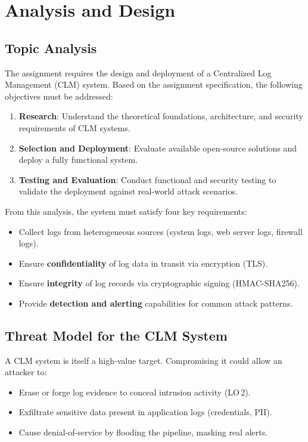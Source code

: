\documentclass[12pt,a4paper]{report}
\begin{document}
\chapter{Analysis and Design}
\label{chap:design}

\section{Topic Analysis}

The assignment requires the design and deployment of a Centralized Log Management (CLM) system.
Based on the assignment specification, the following objectives must be addressed:
\begin{enumerate}[leftmargin=1.5em]
    \item \textbf{Research}: Understand the theoretical foundations, architecture, and security requirements of CLM systems.
    \item \textbf{Selection and Deployment}: Evaluate available open-source solutions and deploy a fully functional system.
    \item \textbf{Testing and Evaluation}: Conduct functional and security testing to validate the deployment against real-world attack scenarios.
\end{enumerate}

From this analysis, the system must satisfy four key requirements:
\begin{itemize}[leftmargin=1.5em]
    \item Collect logs from heterogeneous sources (system logs, web server logs, firewall logs).
    \item Ensure \textbf{confidentiality} of log data in transit via encryption (TLS).
    \item Ensure \textbf{integrity} of log records via cryptographic signing (HMAC-SHA256).
    \item Provide \textbf{detection and alerting} capabilities for common attack patterns.
\end{itemize}

\section{Threat Model for the CLM System}

A CLM system is itself a high-value target.
Compromising it could allow an attacker to:
\begin{itemize}[leftmargin=1.5em]
    \item Erase or forge log evidence to conceal intrusion activity (LO\,2).
    \item Exfiltrate sensitive data present in application logs (credentials, PII).
    \item Cause denial-of-service by flooding the pipeline, masking real alerts.
\end{itemize}
\end{document}
